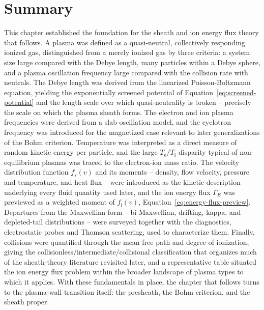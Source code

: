\section{Summary}
\label{sec:fundamentals-summary}

This chapter established the foundation for the sheath and ion energy flux theory that follows. A plasma was defined as a quasi-neutral, collectively responding ionized gas, distinguished from a merely ionized gas by three criteria: a system size large compared with the Debye length, many particles within a Debye sphere, and a plasma oscillation frequency large compared with the collision rate with neutrals. The Debye length was derived from the linearized Poisson-Boltzmann equation, yielding the exponentially screened potential of Equation~\eqref{eq:screened-potential} and the length scale over which quasi-neutrality is broken -- precisely the scale on which the plasma sheath forms. The electron and ion plasma frequencies were derived from a slab oscillation model, and the cyclotron frequency was introduced for the magnetized case relevant to later generalizations of the Bohm criterion. Temperature was interpreted as a direct measure of random kinetic energy per particle, and the large $T_{\mathrm{e}}/T_{\mathrm{i}}$ disparity typical of non-equilibrium plasmas was traced to the electron-ion mass ratio. The velocity distribution function $f_{s}(v)$ and its moments -- density, flow velocity, pressure and temperature, and heat flux -- were introduced as the kinetic description underlying every fluid quantity used later, and the ion energy flux $\Gamma_{E}$ was previewed as a weighted moment of $f_{\mathrm{i}}(v)$, Equation~\eqref{eq:energy-flux-preview}. Departures from the Maxwellian form -- bi-Maxwellian, drifting, kappa, and depleted-tail distributions -- were surveyed together with the diagnostics, electrostatic probes and Thomson scattering, used to characterize them. Finally, collisions were quantified through the mean free path and degree of ionization, giving the collisionless/intermediate/collisional classification that organizes much of the sheath-theory literature revisited later, and a representative table situated the ion energy flux problem within the broader landscape of plasma types to which it applies. With these fundamentals in place, the chapter that follows turns to the plasma-wall transition itself: the presheath, the Bohm criterion, and the sheath proper.
